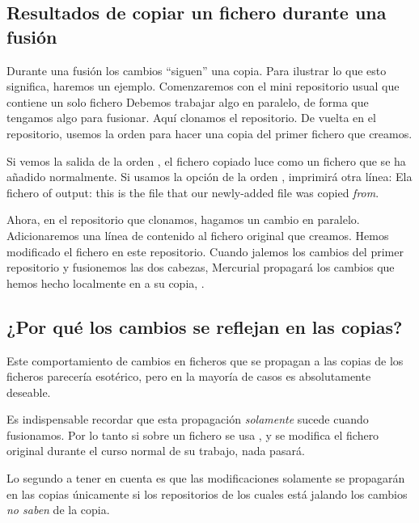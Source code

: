 \subsection{Resultados de copiar un fichero durante una fusión}

Durante una fusión los cambios ``siguen'' una copia.  Para ilustrar
lo que esto significa, haremos un ejemplo.  Comenzaremos con el mini
repositorio usual que contiene un solo fichero
Debemos trabajar algo en paralelo, de forma que tengamos algo para
fusionar. Aquí clonamos el repositorio.
De vuelta en el repositorio, usemos la orden  para hacer
una copia del primer fichero que creamos.

Si vemos la salida de la orden , el fichero copiado luce
como un fichero que se ha añadido normalmente.
Si usamos la opción  de la orden ,
imprimirá otra línea: Ela fichero of output: this is the file that our newly-added
file was copied \emph{from}.

Ahora, en el repositorio que clonamos, hagamos un cambio en
paralelo. Adicionaremos una línea de contenido al fichero original que
creamos.
Hemos modificado el fichero  en este
repositorio. Cuando jalemos los cambios del primer repositorio y
fusionemos las dos cabezas, Mercurial propagará los cambios que hemos
hecho localmente en  a su copia, .

\subsection{¿Por qué los cambios se reflejan en las copias?}
\label{sec:daily:why-copy}

Este comportamiento de cambios en ficheros que se propagan a las
copias de los ficheros parecería esotérico, pero en la mayoría de
casos es absolutamente deseable.

Es indispensable recordar que esta propagación \emph{solamente} sucede
cuando fusionamos.  Por lo tanto si sobre un fichero se usa
, y se modifica el fichero original durante el curso
normal de su trabajo, nada pasará.

Lo segundo a tener en cuenta es que las modificaciones solamente se
propagarán en las copias únicamente si los repositorios de los cuales
está jalando los cambios \emph{no saben} de la copia.

